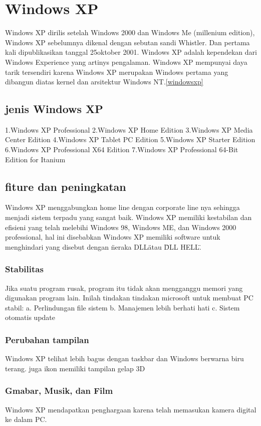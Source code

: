 	\section{Windows XP}
		Windows XP dirilis setelah Windows 2000 dan Windows Me (millenium edition), Windows XP sebelumnya dikenal dengan sebutan sandi Whistler. Dan pertama kali dipublikasikan tanggal 25oktober 2001. Windows XP adalah kependekan dari Windows Experience yang artinys pengalaman. Windows XP mempunyai daya tarik tersendiri karena Windows XP merupakan Windows pertama yang dibangun diatas kernel dan arsitektur Windows NT.\cite{pogue2002windows}\ref{windowsxp}
		\subsection{jenis Windows XP}
			1.Windows XP Professional
			2.Windows XP Home Edition
			3.Windows XP Media Center Edition
			4.Windows XP Tablet PC Edition
			5.Windows XP Starter Edition
			6.Windows XP Professional X64 Edition
			7.Windows XP Professional 64-Bit Edition for Itanium
		\subsection{fiture dan peningkatan}
			Windows XP menggabungkan home line dengan corporate line nya sehingga menjadi sistem terpadu yang sangat baik. Windows XP memiliki kestabilan dan efisieni yang telah melebihi Windows 98, Windows ME, dan Windows 2000 professional, hal ini disebabkan Windows XP memiliki software untuk menghindari yang disebut dengan \"neraka DLL\" atau \"DLL HELL\".
			\subsubsection{Stabilitas}
				Jika suatu program rusak, program itu tidak akan mengganggu memori yang digunakan program lain. Inilah tindakan tindakan microsoft untuk membuat PC stabil:
		 			a. Perlindungan file sistem
		 			b. Manajemen lebih berhati hati
		 			c. Sistem otomatis update
			\subsubsection{Perubahan tampilan}
				Windows XP telihat lebih bagus dengan taskbar dan Windows berwarna biru terang. juga ikon memiliki tampilan gelap 3D
			\subsubsection{Gmabar, Musik, dan Film}
				Windows XP mendapatkan penghargaan karena telah memasukan kamera digital ke dalam PC.
